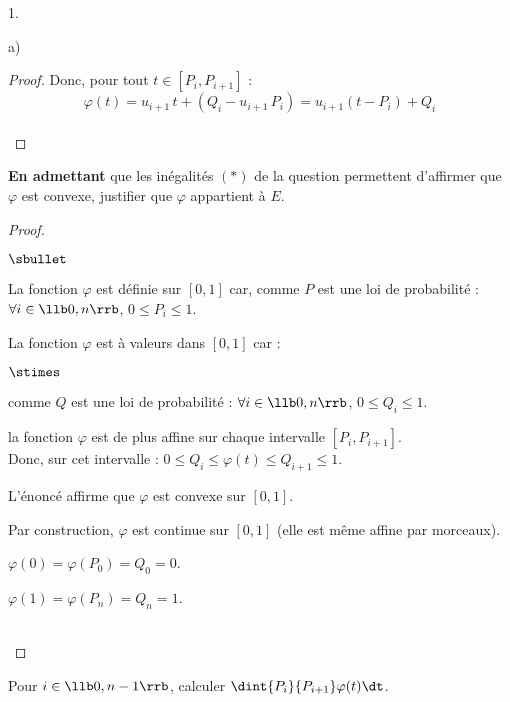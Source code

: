 \documentclass[11pt]{article}%
\begin{document}
\begin{noliste}{1.}
\begin{noliste}{a)}
\begin{proof}
      Donc, pour tout $t\in [P_i, P_{i+1}]$ :
      \[
        \varphi(t) = u_{i+1} \, t +(Q_i-u_{i+1} \, P_i) = 
        u_{i+1}(t-P_i) + Q_i
      \]
      ~\\[-1cm]
  \end{proof}
  
  \item \textbf{En admettant} que les inégalités $(\ast)$ de la 
  question  permettent d'affirmer que $\varphi$ est 
  convexe, justifier que $\varphi$ appartient à $E$. 
  
  \begin{proof}~
    \begin{noliste}{$\sbullet$}
      \item La fonction $\varphi$ est définie sur $[0,1]$ car, comme
      $P$ est une loi de probabilité :
      $\forall i \in \llb 0,n \rrb$, $0 \leq P_i \leq 1$.
      \item La fonction $\varphi$ est à valeurs dans $[0,1]$ car :
      \begin{noliste}{$\stimes$}
      \item comme $Q$ est une loi de probabilité :
      $\forall i \in \llb 0,n \rrb$, $0 \leq Q_i \leq 1$.
      \item la fonction $\varphi$ est de plus affine sur chaque 
      intervalle $[P_i,P_{i+1}]$.\\
      Donc, sur cet intervalle : $0 \leq Q_i \leq \varphi(t) \leq 
      Q_{i+1} \leq 1$.
      \end{noliste}
      \item L'énoncé affirme que $\varphi$ est convexe sur $[0,1]$.
      \item Par construction, $\varphi$ est continue sur $[0,1]$ 
      (elle est même affine par morceaux).
      \item $\varphi(0)=\varphi(P_0)=Q_0=0$.
      \item $\varphi(1)=\varphi(P_n) =Q_n =1$.
    \end{noliste}
    ~\\[-1cm]
  \end{proof}

  
  \item Pour $i \in \llb 0,n-1 \rrb$, calculer $\dint{P_i}{P_{i+1}} 
  \varphi(t) \dt$. 
  

\end{noliste}
\end{noliste}
\end{document}
